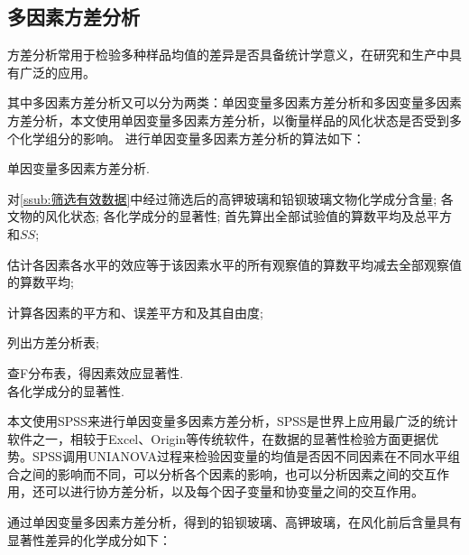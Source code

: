 \subsection{多因素方差分析} %
\label{sub:多因素方差分析}

方差分析常用于检验多种样品均值的差异是否具备统计学意义，在研究和生产中具有广泛的应用。

其中多因素方差分析又可以分为两类：单因变量多因素方差分析和多因变量多因素方差分析，本文使用单因变量多因素方差分析，以衡量样品的风化状态是否受到多个化学组分的影响。
进行单因变量多因素方差分析的算法如下：

\begin{algorithm}[htb]
  \caption{ 单因变量多因素方差分析.}
  \label{alg:spss}
  \begin{algorithmic}[1]
    \Require
      对\ref{ssub:筛选有效数据}中经过筛选后的高钾玻璃和铅钡玻璃文物化学成分含量;
      各文物的风化状态;
    \Ensure
      各化学成分的显著性;
    \State 首先算出全部试验值的算数平均及总平方和$SS$;

    \State 估计各因素各水平的效应等于该因素水平的所有观察值的算数平均减去全部观察值的算数平均;

    \State 计算各因素的平方和、误差平方和及其自由度;

    \State 列出方差分析表;

    \State 查F分布表，得因素效应显著性.\\
    \Return 各化学成分的显著性.
  \end{algorithmic}
\end{algorithm}

本文使用SPSS来进行单因变量多因素方差分析，SPSS是世界上应用最广泛的统计软件之一，相较于Excel、Origin等传统软件，在数据的显著性检验方面更据优势。SPSS调用UNIANOVA过程来检验因变量的均值是否因不同因素在不同水平组合之间的影响而不同，可以分析各个因素的影响，也可以分析因素之间的交互作用，还可以进行协方差分析，以及每个因子变量和协变量之间的交互作用\cite{spss}。

通过单因变量多因素方差分析，得到的铅钡玻璃、高钾玻璃，在风化前后含量具有显著性差异的化学成分如下：

